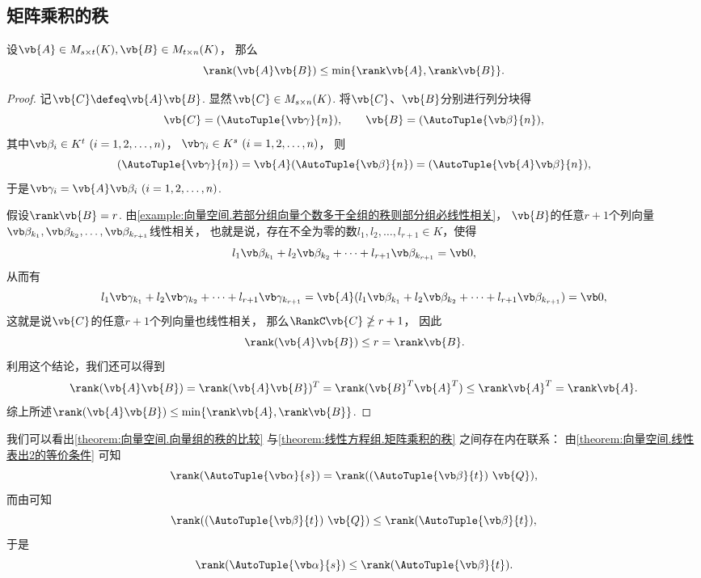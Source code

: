 \subsection{矩阵乘积的秩}
\begin{theorem}\label{theorem:线性方程组.矩阵乘积的秩}
设\(\vb{A} \in M_{s \times t}(K),
\vb{B} \in M_{t \times n}(K)\)，
那么\[
	\rank(\vb{A}\vb{B}) \leq \min\{\rank\vb{A},\rank\vb{B}\}.
\]
\begin{proof}
记\(\vb{C} \defeq \vb{A}\vb{B}\).
显然\(\vb{C} \in M_{s \times n}(K)\).
将\(\vb{C}\)、\(\vb{B}\)分别进行列分块得\[
	\vb{C} = (\AutoTuple{\vb\gamma}{n}),
	\qquad
	\vb{B} = (\AutoTuple{\vb\beta}{n}),
\]
其中\(\vb\beta_i \in K^t\ (i=1,2,\dotsc,n)\)，
\(\vb\gamma_i \in K^s\ (i=1,2,\dotsc,n)\)，
则\[
	(\AutoTuple{\vb\gamma}{n})
	= \vb{A} (\AutoTuple{\vb\beta}{n})
	= (\AutoTuple{\vb{A}\vb\beta}{n}),
\]
于是\(\vb\gamma_i = \vb{A} \vb\beta_i\ (i=1,2,\dotsc,n)\).

假设\(\rank\vb{B} = r\).
由\cref{example:向量空间.若部分组向量个数多于全组的秩则部分组必线性相关}，
\(\vb{B}\)的任意\(r+1\)个列向量
\(\vb\beta_{k_1},\vb\beta_{k_2},\dotsc,\vb\beta_{k_{r+1}}\)线性相关，
也就是说，存在不全为零的数\(l_1,l_2,\dotsc,l_{r+1}\in K\)，使得\[
	l_1 \vb\beta_{k_1} + l_2 \vb\beta_{k_2} + \dotsb + l_{r+1} \vb\beta_{k_{r+1}} = \vb0,
\]
从而有\[
	l_1 \vb\gamma_{k_1} + l_2 \vb\gamma_{k_2} + \dotsb + l_{r+1} \vb\gamma_{k_{r+1}}
	= \vb{A}(l_1 \vb\beta_{k_1} + l_2 \vb\beta_{k_2} + \dotsb + l_{r+1} \vb\beta_{k_{r+1}})
	= \vb0,
\]
这就是说\(\vb{C}\)的任意\(r+1\)个列向量也线性相关，
那么\(\RankC\vb{C} \ngeq r+1\)，
因此\[
	\rank(\vb{A}\vb{B})
	\leq r = \rank\vb{B}.
\]
利用这个结论，我们还可以得到\[
	\rank(\vb{A}\vb{B})
	= \rank(\vb{A}\vb{B})^T
	= \rank(\vb{B}^T \vb{A}^T)
	\leq \rank \vb{A}^T
	= \rank \vb{A}.
\]
综上所述\(\rank(\vb{A}\vb{B}) \leq \min\{\rank\vb{A},\rank\vb{B}\}\).
\end{proof}
\end{theorem}
\begin{remark}
我们可以看出\cref{theorem:向量空间.向量组的秩的比较}
与\cref{theorem:线性方程组.矩阵乘积的秩} 之间存在内在联系：
由\cref{theorem:向量空间.线性表出2的等价条件} 可知\[
	\rank(\AutoTuple{\vb\alpha}{s})
	= \rank((\AutoTuple{\vb\beta}{t})~\vb{Q}),
\]
而由可知\[
	\rank((\AutoTuple{\vb\beta}{t})~\vb{Q})
	\leq \rank(\AutoTuple{\vb\beta}{t}),
\]
于是\[
	\rank(\AutoTuple{\vb\alpha}{s})
	\leq \rank(\AutoTuple{\vb\beta}{t}).
\]
\end{remark}

